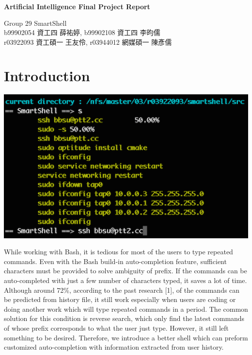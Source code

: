 \documentclass[11pt,a4paper]{article}
\begin{document}

\begin{center}
\textbf{\Large Artificial Intelligence Final Project Report}\\[1em]
\begin{CJK}{UTF8}{bsmi}
{\Large Group 29 SmartShell}\\[1em]
{\large b99902054 資工四 薛祐婷, }
{\large b99902108 資工四 李昀儒 }\\[1em]
{\large r03922093 資工碩一 王友伶, }
{\large r03944012 網媒碩一 陳彥儒 }\\[1em]
\end{CJK}
\end{center}
\section*{Introduction}
\begin{center}
\includegraphics[scale=0.6]{1.png}
\end{center}
While working with Bash, it is tedious for most of the users to type repeated commands. 
Even with the Bash build-in auto-completion feature, sufficient characters must be provided to solve ambiguity of prefix.
If the commands can be auto-completed with just a few number of characters typed, it saves a lot of time. 
Although around 72\%, according to the past research [1], of the commands can be predicted from history file, 
it still work especially when users are coding or doing another work which will type repeated commands in a period. 
The common solution for this condition is reverse search, 
which only find the latest commands of whose prefix corresponds to what the user just type. 
However, it still left something to be desired. 
Therefore, we introduce a better shell which can preform customized auto-completion with information extracted from user history.
\end{document}

